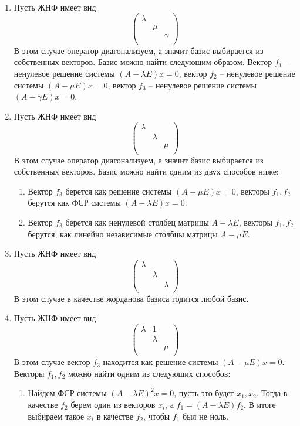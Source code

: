 \documentclass{article}
\begin{document}
\begin{enumerate}
\item Пусть ЖНФ имеет вид
\[
\begin{pmatrix}
{\lambda}&{}&{}\\
{}&{\mu}&{}\\
{}&{}&{\gamma}\\
\end{pmatrix}
\]
В этом случае оператор диагонализуем, а значит базис выбирается из собственных векторов.
Базис можно найти следующим образом.
Вектор $f_1$ -- ненулевое решение системы $(A - \lambda E) x = 0$, вектор $f_2 $ -- ненулевое решение системы $(A - \mu E) x = 0$, вектор $f_3$ -- ненулевое решение системы $(A - \gamma E) x = 0$.

\item Пусть ЖНФ имеет вид
\[
\begin{pmatrix}
{\lambda}&{}&{}\\
{}&{\lambda}&{}\\
{}&{}&{\mu}\\
\end{pmatrix}
\]
В этом случае оператор диагонализуем, а значит базис выбирается из собственных векторов.
Базис можно найти одним из двух способов ниже:
\begin{enumerate}
\item Вектор $f_3$ берется как решение системы $(A - \mu E) x = 0$, векторы $f_1, f_2$ берутся как ФСР системы $(A - \lambda E) x = 0$.

\item Вектор $f_3$ берется как ненулевой столбец матрицы $A - \lambda E$, векторы $f_1, f_2$ берутся, как линейно независимые столбцы матрицы $A - \mu  E$.
\end{enumerate}

\item Пусть ЖНФ имеет вид
\[
\begin{pmatrix}
{\lambda}&{}&{}\\
{}&{\lambda}&{}\\
{}&{}&{\lambda}\\
\end{pmatrix}
\]
В этом случае в качестве жорданова базиса годится любой базис.

\item Пусть ЖНФ имеет вид
\[
\begin{pmatrix}
{\lambda}&{1}&{}\\
{}&{\lambda}&{}\\
{}&{}&{\mu}\\
\end{pmatrix}
\]
В этом случае вектор $f_3$ находится как решение системы $(A - \mu E) x = 0$.
Векторы $f_1, f_2$ можно найти одним из следующих способов:
\begin{enumerate}
\item Найдем ФСР системы $(A - \lambda E)^2 x = 0$, пусть это будет $x_1, x_2$.
Тогда в качестве $f_2$ берем один из векторов $x_i$, а $f_1 = (A - \lambda E) f_2$.
В итоге выбираем такое $x_i$ в качестве $f_2$, чтобы $f_1$ был не ноль.


\end{enumerate}
\end{enumerate}
\end{document}

